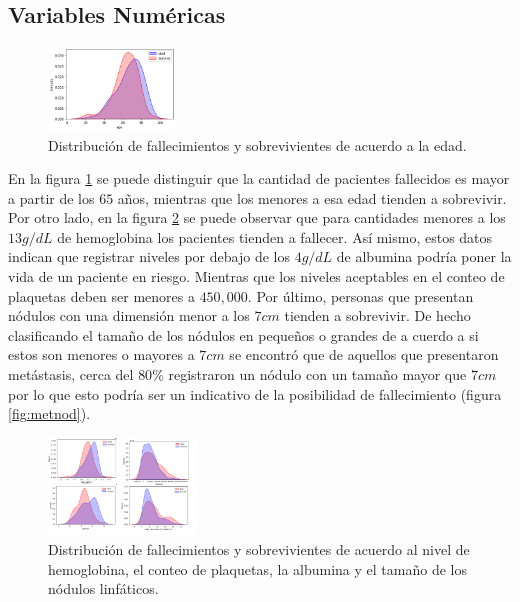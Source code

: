 \documentclass[6pt, twocolumn]{article}
\begin{document}
\subsection{Variables Numéricas}

\begin{figure}
\centering
\includegraphics[width = 0.3\textwidth]{./age.png}
\caption{\footnotesize \label{fig:age}Distribución de fallecimientos y sobrevivientes de acuerdo a la edad.}
\end{figure}


En la figura \ref{fig:age} se puede distinguir que la cantidad de pacientes fallecidos es mayor a partir de los $65$ a\~nos, mientras que los menores a esa edad tienden a sobrevivir. Por otro lado, en la figura \ref{fig:hemo} se puede observar que para cantidades menores a los $13g/dL$ de hemoglobina los pacientes tienden a fallecer. Así mismo, estos datos indican que registrar niveles por debajo de los $4 g/dL$ de albumina podría poner la vida de un paciente en riesgo. Mientras que los niveles aceptables en el conteo de plaquetas deben ser menores a $450,000$. Por último, personas que presentan nódulos con una dimensión menor a los $7cm$ tienden a sobrevivir. De hecho clasificando el tama\~no de los nódulos en pequeños o grandes de a cuerdo a si estos son menores o mayores a $7cm$ se encontró que de aquellos que presentaron metástasis, cerca del $80\%$ registraron un nódulo con un tamaño mayor que $7cm$ por lo que esto podría ser un indicativo de la posibilidad de fallecimiento (figura \ref{fig:metnod}).

\begin{figure}
\centering
\includegraphics[width = 0.35\textwidth]{./hemo.png}
\caption{\footnotesize \label{fig:hemo}Distribución de fallecimientos y sobrevivientes de acuerdo al nivel de hemoglobina, el conteo de plaquetas, la albumina y el tama\~no de los nódulos linfáticos.}
\end{figure}
\end{document}
